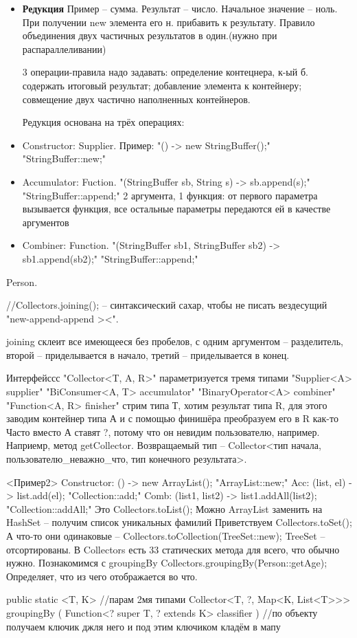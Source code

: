 \begin{itemize}
\item\textbf{Редукция}
	Пример -- сумма. Результат -- число. Начальное значение -- ноль.
	При получении  new элемента его н. прибавить к результату.
	Правило объединения двух частичных результатов в один.(нужно при распараллеливании)
	
3 операции-правила надо задавать: определение контецнера, к-ый б. содержать итоговый результат; добавление элемента к контейнеру; совмещение двух частично наполненных контейнеров.

Редукция основана на трёх операциях: 
\item Constructor: Supplier. Пример: \java"() -> new StringBuffer();" \java"StringBuffer::new;"
\item Accumulator: Fuction. \java"(StringBuffer sb, String s) -> sb.append(s);" \java"StringBuffer::append;" 2 аргумента, 1 функция: от первого параметра вызывается функция, все остальные параметры передаются ей в качестве аргументов
\item Combiner: Function. \java"(StringBuffer sb1, StringBuffer sb2) -> sb1.append(sb2);" \java"StringBuffer::append;"
\end{itemize}
\begin{exmp}
Person.
\begin{javacode}
//Collectors.joining(); -- синтаксический сахар, чтобы не писать вездесущий "new-append-append ><".
\end{javacode}
joining склеит все имеющееся без пробелов, с одним аргументом -- разделитель, второй -- приделывается в начало, третий -- приделывается в конец.
\end{exmp}
Интерфейссс \java"Collector<T, A, R>" параметризуется тремя типами
\java"Supplier<A> supplier"
\java"BiConsumer<A, T> accumulator"
\java"BinaryOperator<A> combiner"
\java"Function<A, R> finisher"
стрим типа Т, хотим результат типа R, для этого заводим контейнер типа А и с помощью финишёра преобразуем его в R как-то
Часто вместо А ставят ?, потому что он невидим пользователю, например. Наприемр, метод getCollector. Возвращаемый тип -- Collector<тип начала, пользователю\_неважно\_что, тип конечного результата>.


<Пример2>
Constructor: () -> new ArrayList(); \java"ArrayList::new;"
Acc: (list, el) -> list.add(el); \java"Collection::add;"
Comb: (list1, list2) -> list1.addAll(list2); \java"Collection::addAll;"
Это Collectors.toList();
Можно ArrayList заменить на HashSet -- получим список уникальных фамилий
Приветствуем Collectors.toSet();
А что-то они одинаковые -- Collectors.toCollection(TreeSet::new);
TreeSet -- отсортированы.
В Collectors есть 33 статических метода для всего, что обычно нужно. Познакомимся с groupingBy
Collectors.groupingBy(Person::getAge); Определяет, что из чего отображается во что.
\begin{javacode}
public static <T, K> //парам 2мя типами
Collector<T, ?, Map<K, List<T>>> groupingBy (
	Function<? super T, ? extends K> classifier
)
//по объекту получаем ключик джля него и под этим ключиком кладём в мапу
\end{javacode}

